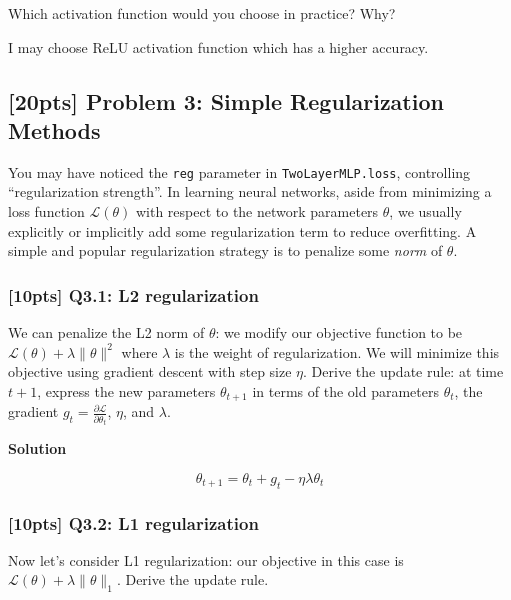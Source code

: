\documentclass[11pt]{article}
\begin{document}
Which activation function would you choose in practice? Why?

    I may choose ReLU activation function which has a higher accuracy.

    \hypertarget{pts-problem-3-simple-regularization-methods}{%
\subsection{{[}20pts{]} Problem 3: Simple Regularization
Methods}\label{pts-problem-3-simple-regularization-methods}}

You may have noticed the \texttt{reg} parameter in
\texttt{TwoLayerMLP.loss}, controlling ``regularization strength''. In
learning neural networks, aside from minimizing a loss function
\(\mathcal{L}(\theta)\) with respect to the network parameters
\(\theta\), we usually explicitly or implicitly add some regularization
term to reduce overfitting. A simple and popular regularization strategy
is to penalize some \emph{norm} of \(\theta\).

    \hypertarget{pts-q3.1-l2-regularization}{%
\subsubsection{{[}10pts{]} Q3.1: L2
regularization}\label{pts-q3.1-l2-regularization}}

We can penalize the L2 norm of \(\theta\): we modify our objective
function to be \(\mathcal{L}(\theta) + \lambda \|\theta\|^2\) where
\(\lambda\) is the weight of regularization. We will minimize this
objective using gradient descent with step size \(\eta\). Derive the
update rule: at time \(t+1\), express the new parameters
\(\theta_{t+1}\) in terms of the old parameters \(\theta_t\), the
gradient \(g_t=\frac{\partial \mathcal{L}}{\partial \theta_t}\),
\(\eta\), and \(\lambda\).

    \textbf{Solution}

\[\theta_{t+1} =  \theta_t + g_t - \eta  \lambda \theta_t \]

    \hypertarget{pts-q3.2-l1-regularization}{%
\subsubsection{{[}10pts{]} Q3.2: L1
regularization}\label{pts-q3.2-l1-regularization}}

Now let's consider L1 regularization: our objective in this case is
\(\mathcal{L}(\theta) + \lambda \|\theta\|_1\). Derive the update rule.
\end{document}
